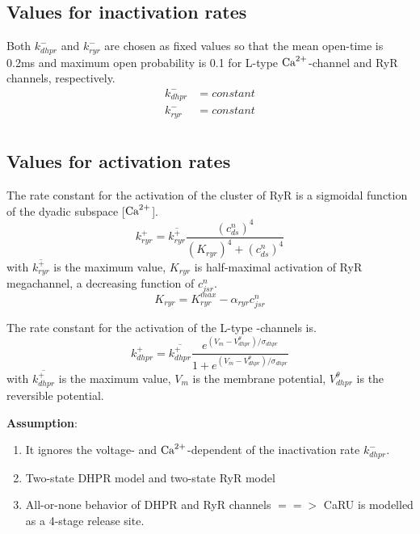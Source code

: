 \subsection{Values for inactivation rates}
\label{sec:valu-inact-rates}

Both $k^-_{dhpr}$ and $k^-_{ryr}$ are chosen as fixed values so that
the mean open-time is 0.2ms and maximum open probability is 0.1 for
L-type ${\text{Ca}^{2+}}$-channel and RyR channels, respectively.
\begin{equation}
  \label{eq:167}
  \begin{split}
      k^-_{dhpr} &= constant \\
      k^-_{ryr} &= constant \\      
  \end{split}
\end{equation}

\subsection{Values for activation rates}
\label{sec:valu-activ-rates}

The rate constant for the activation of the cluster of RyR is a
sigmoidal function of the dyadic subspace
[${\text{Ca}^{2+}}$]\citep{sobie2002tcas}.
\begin{equation}
  \label{eq:164}
  k^+_{ryr} = \overline{k^+_{ryr}} \frac{(c^n_{ds})^4}{(K_{ryr})^4 + (c^n_{ds})^4}
\end{equation}
with $\overline{k^+_{ryr}}$ is the maximum value, $K_{ryr}$ is
half-maximal activation of RyR megachannel, a decreasing function of $c^n_{jsr}$.  
\begin{equation}
  \label{eq:166}
  K_{ryr} = K^{max}_{ryr} - \alpha_{ryr} c^n_{jsr}
\end{equation}

The rate constant for the activation of the L-type -channels
is\citep{luo1994dmc_b}.
\begin{equation}
  \label{eq:165}
  k^+_{dhpr} = \overline{k^+_{dhpr}} \frac{e^{(V_m -
      V^\theta_{dhpr})/\sigma_{dhpr}}}{1+e^{(V_m -
      V^\theta_{dhpr})/\sigma_{dhpr}} }
\end{equation}
with $ \overline{k^+_{dhpr}}$ is the maximum value, $V_m$ is the
membrane potential, $V^\theta_{dhpr}$ is the reversible potential.


{\bf Assumption}: 
\begin{enumerate}
\item It ignores the voltage- and ${\text{Ca}^{2+}}$-dependent of the
  inactivation rate $k^-_{dhpr}$.
\item Two-state DHPR model and two-state RyR model
\item All-or-none behavior of DHPR and RyR channels $==>$ CaRU is
  modelled as a 4-stage release site.
\end{enumerate}

